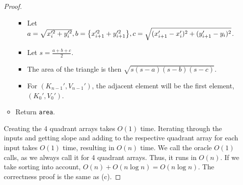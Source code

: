\documentclass[11pt]{scrartcl}
\theoremstyle{dotlessP}
\theoremstyle{dotlessN}
\DeclarePairedDelimiter\set{\{}{\}}
\begin{document}
\begin{enumerate}[(a)]
\begin{proof}
\begin{itemize}
				\begin{itemize}
					\item Let $a = \sqrt{x_i'^2 + y_i'^2}, b = \set*{x_{i+1}'^2 + y_{i+1}'^2}, c = \sqrt{(x_{i+1}' - x_i')^2 + (y_{i+1}' - y_i)^2}$.
					\item Let $s = \displaystyle\frac{a+b+c}{2}$.
					\item The area of the triangle is then  $\sqrt{s(s-a)(s-b)(s-c)}$.
					\item For  $(K_{n-1}', V_{n-1}')$, the adjacent element will be the first element,  $(K_0', V_0')$.
				\end{itemize}
			\item Return \texttt{area}.
		\end{itemize}
		Creating the 4 quadrant arrays takes $O(1)$ time. Iterating through the inputs and getting slope and adding to the respective quadrant array for each input takes $O(1)$ time, resulting in $O(n)$ time. We call the oracle $O(1)$ calls, as we always call it for 4 quadrant arrays. Thus, it runs in $O(n)$. If we take sorting into account, $O(n) + O(n\log n) = O(n\log n)$. The correctness proof is the same as (c).
	\end{proof}
\end{enumerate}
\end{document}

